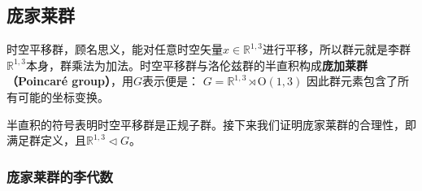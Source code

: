 

\begin{issues}
\issueTODO
\end{issues}


\subsection{庞家莱群}
时空平移群，顾名思义，能对任意时空矢量$x\in \mathbb R^{1,3} $进行平移，所以群元就是李群$\mathbb R^{1,3}$本身，群乘法为加法。时空平移群与洛伦兹群的半直积构成\textbf{庞加莱群（Poincaré group）}，用$G$表示便是：
$G=\mathbb{R}^{1,3} \rtimes \mathrm{O}(1,3)$
因此群元素包含了所有可能的坐标变换。

半直积的符号表明时空平移群是正规子群。接下来我们证明庞家莱群的合理性，即满足群定义，且$\mathbb R^{1,3}\vartriangleleft G$。

\subsubsection{庞家莱群的李代数}